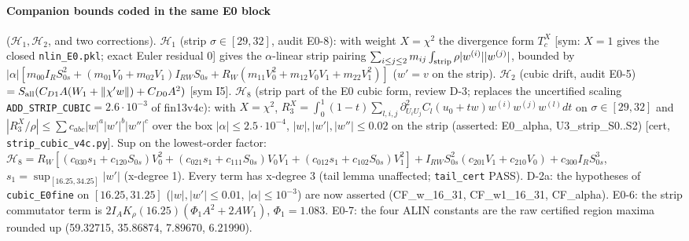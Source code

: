 \documentclass[10pt]{article}
\begin{document}
\paragraph{Companion bounds coded in the same E0 block} ($\mathcal H_1,\mathcal H_2$, and two corrections).
$\mathcal H_1$ (strip $\sigma\in[29,32]$, audit E0-8): with weight $X=\chi^2$ the divergence form $T_c^X$ [sym: $X=1$ gives the closed \texttt{nlin\_E0.pkl};
exact Euler residual 0] gives the $\alpha$-linear strip pairing $\sum_{i\le j\le2}m_{ij}\int_{\rm strip}\rho|w^{(i)}||w^{(j)}|$, bounded by
$|\alpha|[m_{00}I_RS_{0s}^2+(m_{01}V_0+m_{02}V_1)I_{RW}S_{0s}+R_W(m_{11}V_0^2+m_{12}V_0V_1+m_{22}V_1^2)]$ ($w'=v$ on the strip). $\mathcal H_2$ (cubic drift, audit E0-5) $=S_{\rm all}(C_{D1}A(W_1+\|\chi'w\|)+C_{D0}A^2)$ [sym I5].
$\mathcal H_8$ (strip part of the E0 cubic form, review D-3; replaces the uncertified scaling \texttt{ADD\_STRIP\_CUBIC}$=2.6\cdot10^{-3}$ of fin13v4c):
with $X=\chi^2$, $R_3^X=\int_0^1(1-t)\sum_{l,i,j}\partial^2_{U_iU_j}C_l(u_0+tw)w^{(i)}w^{(j)}w^{(l)}dt$ on $\sigma\in[29,32]$ and
$|R_3^X/\rho|\le\sum c_{abc}|w|^a|w'|^b|w''|^c$ over the box $|\alpha|\le2.5\cdot10^{-4}$, $|w|,|w'|,|w''|\le0.02$ on the strip (asserted: E0\_alpha, U3\_strip\_S0..S2) [cert, \texttt{strip\_cubic\_v4c.py}].
Sup on the lowest-order factor: $\mathcal H_8=R_W[(c_{030}s_1+c_{120}S_{0s})V_0^2+(c_{021}s_1+c_{111}S_{0s})V_0V_1+(c_{012}s_1+c_{102}S_{0s})V_1^2]
+I_{RW}S_{0s}^2(c_{201}V_1+c_{210}V_0)+c_{300}I_RS_{0s}^3$, $s_1=\sup_{[16.25,34.25]}|w'|$ (x-degree 1). Every term has x-degree 3 (tail lemma unaffected; \texttt{tail\_cert} PASS).
D-2a: the hypotheses of \texttt{cubic\_E0fine} on $[16.25,31.25]$ ($|w|,|w'|\le0.01$, $|\alpha|\le10^{-3}$) are now asserted (CF\_w\_16\_31, CF\_w1\_16\_31, CF\_alpha).
E0-6: the strip commutator term is $2I_AK_\rho(16.25)(\Phi_1A^2+2AW_1)$, $\Phi_1=1.083$. E0-7: the four ALIN constants are the raw certified region maxima rounded up
(59.32715, 35.86874, 7.89670, 6.21990).
\end{document}

